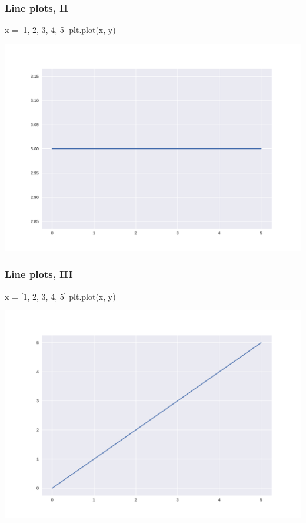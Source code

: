 \documentclass[english,serif,mathserif,xcolor=pdftex,dvipsnames,table]{beamer}
\begin{document}
\begin{frame}[fragile]
  \frametitle{Line plots, II}
\begin{semiverbatim}\small
\In x = [1, 2, 3, 4, 5]
\In {}
\In plt.plot(x, y)
\end{semiverbatim}
  \begin{center}
    \includegraphics[height=0.66\textheight]{fig/lineplot0.pdf}
  \end{center}
\end{frame}


\begin{frame}[fragile]
  \frametitle{Line plots, III}
\begin{semiverbatim}\small
\In x = [1, 2, 3, 4, 5]
\In {}
\In plt.plot(x, y)
\end{semiverbatim}
  \begin{center}
    \includegraphics[height=0.66\textheight]{fig/lineplot1.pdf}
  \end{center}
\end{frame}
\end{document}
